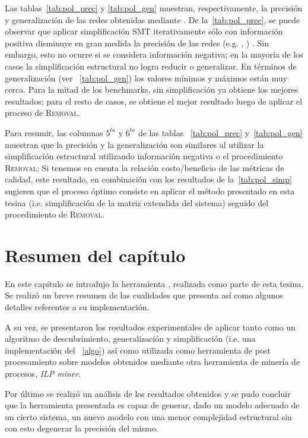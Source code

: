 Las tablas~\ref{tab:pol_prec} y \ref{tab:pol_gen} muestran, respectivamente, la precisión y generalización de las redes
obtenidas mediante \pachtool. De la~\autoref{tab:pol_prec}, se puede observar que 
aplicar simplificación SMT iterativamente sólo con información positiva disminuye en gran medida la precisión de las
redes (e.g. , ) . Sin embargo, esto no ocurre si se considera 
información negativa; en la mayoría de los casos la simplificación estructural no logra reducir o generalizar.
En términos de generalización (ver ~\autoref{tab:pol_gen}) los valores mínimos y máximos están muy 
cerca. Para la mitad de los benchmarks, \pachtool sin simplificación ya obtiene los mejores resultados;
para el resto de casos, se obtiene el mejor resultado luego de aplicar el proceso de \textsc{Removal}.



Para resumir, las columnas $5^{ta}$ y $6^{ta}$ de las tablas ~\ref{tab:pol_prec} y~\ref{tab:pol_gen} muestran que 
la precisión y la generalización son similares al utilizar la simplificación estructural utilizando información 
negativa o el procedimiento \textsc{Removal}; 
Si tenemos en cuenta la relación costo/beneficio de las métricas de calidad, este resultado,
en combinación con los resultados de la~\autoref{tab:pol_simp}
sugieren que el proceso óptimo consiste en aplicar el método presentado en esta tesina (i.e. simplificación de la matriz 
extendida del sistema) seguido del procedimiento de \textsc{Removal}.



\section{Resumen del capítulo}
\label{sec:4.resumen}

En este capítulo se introdujo la herramienta \pachtool, realizada como parte de esta tesina. Se realizó un breve
resumen de las cualidades que presenta así como algunos detalles referentes a su implementación.

A su vez, se presentaron los resultados experimentales de aplicar \pachtool tanto como un algoritmo de 
descubrimiento, generalización y simplificación (i.e. una implementación del ~\autoref{algo}) así como 
utilizada como herramienta de post procesamiento sobre modelos obtenidos mediante otra herramienta de 
minería de procesos, \textit{ILP miner}.

Por último se realizó un análisis de los resultados obtenidos y se pudo concluir que la herramienta presentada
es capaz de generar, dado un modelo adecuado de un cierto sistema, un nuevo modelo con una menor complejidad estructural
sin con esto degenerar la precisión del mismo.

